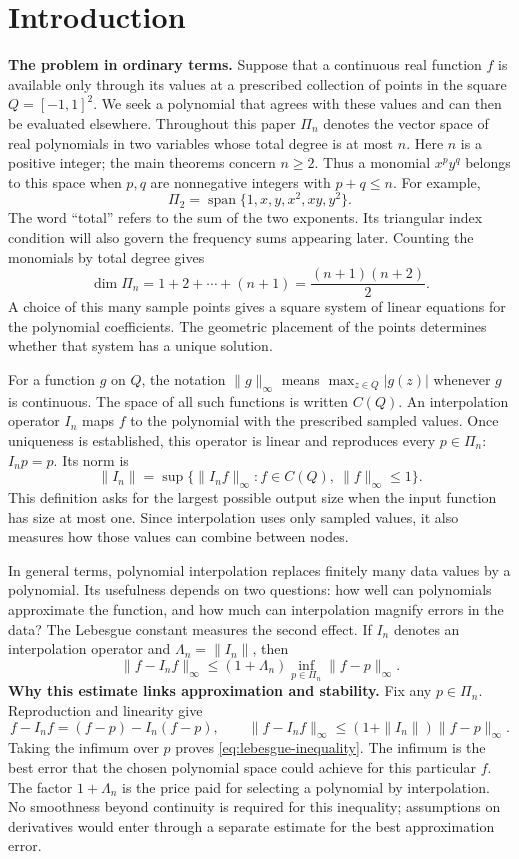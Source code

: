 \section{Introduction}\label{sec:introduction}
\noindent\textbf{The problem in ordinary terms.}
Suppose that a continuous real function $f$ is available only through its
values at a prescribed collection of points in the square $Q=[-1,1]^2$.
We seek a polynomial that agrees with these values and can then be
evaluated elsewhere. Throughout this paper $\Pi_n$ denotes the vector
space of real polynomials in two variables whose total degree is at most
$n$. Here $n$ is a positive integer; the main theorems concern $n\geq2$.
Thus a monomial $x^py^q$ belongs to this space when $p,q$ are
nonnegative integers with $p+q\leq n$. For example,
\[
 \Pi_2=\operatorname{span}\{1,x,y,x^2,xy,y^2\}.
\]
The word ``total'' refers to the sum of the two exponents. Its triangular
index condition will also govern the frequency sums appearing later.
Counting the monomials by total degree gives
\[
 \dim\Pi_n=1+2+\cdots+(n+1)=\frac{(n+1)(n+2)}2.
\]
A choice of this many sample points gives a square system of linear
equations for the polynomial coefficients. The geometric placement of
the points determines whether that system has a unique solution.

For a function $g$ on $Q$, the notation $\|g\|_\infty$ means
$\max_{z\in Q}|g(z)|$ whenever $g$ is continuous. The space of all such
functions is written $C(Q)$. An interpolation operator $I_n$ maps $f$ to
the polynomial with the prescribed sampled values. Once uniqueness is
established, this operator is linear and reproduces every $p\in\Pi_n$:
$I_np=p$. Its norm is
\[
 \|I_n\|=\sup\{\|I_nf\|_\infty:f\in C(Q),\ \|f\|_\infty\leq1\}.
\]
This definition asks for the largest possible output size when the input
function has size at most one. Since interpolation uses only sampled
values, it also measures how those values can combine between nodes.

In general terms, polynomial interpolation replaces finitely many data values by a polynomial.
Its usefulness depends on two questions: how well can polynomials approximate
the function, and how much can interpolation magnify errors in the data?
The Lebesgue constant measures the second effect. If $I_n$ denotes an
interpolation operator and $\Lambda_n=\|I_n\|$, then
\begin{equation}\label{eq:lebesgue-inequality}
 \|f-I_nf\|_\infty\leq (1+\Lambda_n)
       \inf_{p\in\Pi_n}\|f-p\|_\infty.
\end{equation}
\noindent\textbf{Why this estimate links approximation and stability.}
Fix any $p\in\Pi_n$. Reproduction and linearity give
\[
 f-I_nf=(f-p)-I_n(f-p),
 \qquad
 \|f-I_nf\|_\infty\leq(1+\|I_n\|)\|f-p\|_\infty.
\]
Taking the infimum over $p$ proves
\eqref{eq:lebesgue-inequality}. The infimum is the best error that the
chosen polynomial space could achieve for this particular $f$. The
factor $1+\Lambda_n$ is the price paid for selecting a polynomial by
interpolation. No smoothness beyond continuity is required for this
inequality; assumptions on derivatives would enter through a separate
estimate for the best approximation error.

